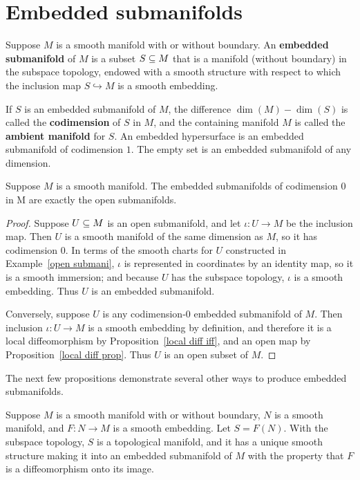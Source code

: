 \section{Embedded submanifolds}
Suppose $M$ is a smooth manifold with or without boundary. An \textbf{embedded submanifold} of $M$ is a subset $S\subseteq M$ that is a manifold (without boundary) in the subspace topology, endowed with a smooth structure with respect to which the inclusion map $S\hookrightarrow M$ is a smooth embedding.\par
If $S$ is an embedded submanifold of $M$, the difference $\dim(M)-\dim(S)$ is called the \textbf{codimension} of $S$ in $M$, and the containing manifold $M$ is called the \textbf{ambient manifold} for $S$. An embedded hypersurface is an embedded submanifold of codimension $1$. The empty set is an embedded submanifold of any dimension.
\begin{proposition}\label{open submani iff}
Suppose $M$ is a smooth manifold. The embedded submanifolds of codimension $0$ in M are exactly the open submanifolds.
\end{proposition}
\begin{proof}
Suppose $U\subseteq M$ is an open submanifold, and let $\iota:U\to M$ be the inclusion
map. Then $U$ is a smooth manifold of the same dimension as $M$, so it has codimension $0$. In terms of the smooth charts for $U$ constructed in Example~\ref{open submani}, $\iota$ is represented in coordinates by an identity map, so it is a smooth immersion; and because $U$ has the subspace topology, $\iota$ is a smooth embedding. Thus $U$ is an embedded submanifold.\par 
Conversely, suppose $U$ is any codimension-$0$ embedded submanifold of $M$. Then inclusion $\iota:U\to M$ is a smooth embedding by definition, and therefore it is a local diffeomorphism by Proposition~\ref{local diff iff}, and an open map by Proposition~\ref{local diff prop}. Thus $U$ is an open subset of $M$.
\end{proof}
The next few propositions demonstrate several other ways to produce embedded
submanifolds.
\begin{proposition}\label{image of embedding}
Suppose $M$ is a smooth manifold with or without boundary, $N$ is a smooth manifold, and $F:N\to M$ is a smooth embedding. Let $S=F(N)$. With the subspace topology, $S$ is a topological manifold, and it has a unique smooth structure making it into an embedded submanifold of $M$ with the property that $F$ is a diffeomorphism onto its image.
\end{proposition}
